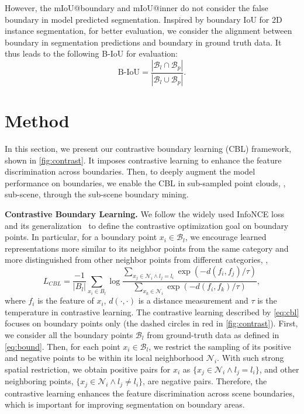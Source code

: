 \documentclass[10pt,twocolumn,letterpaper]{article}
\newcommand{\tly}{}
\begin{document}
However, the mIoU@boundary and mIoU@inner do not consider the false boundary in model predicted segmentation. Inspired by boundary IoU\cite{bound_iou} for 2D instance segmentation, for better evaluation, we consider the alignment between boundary in segmentation predictions and boundary in ground truth data. It thus leads to the following B-IoU for evaluation:
\begin{equation}
    \text{B-IoU} = \frac{|\mathcal B_l \cap \mathcal B_p|}{|\mathcal B_l \cup \mathcal B_p|}.
\label{eq:bound_iou}
\end{equation}

\section{Method}
In this section, we present our contrastive boundary learning (CBL) framework{\tly, shown in \cref{fig:contrast}}.
It imposes contrastive learning to enhance the feature discrimination across boundaries. Then, to deeply augment the model performance on boundaries, we enable the CBL in sub-sampled point clouds, \ie, sub-scene, through the sub-scene boundary mining.


\noindent\textbf{Contrastive Boundary Learning.}
We follow the widely used InfoNCE loss\cite{infonce} and its generalization~\cite{nce, softnn} to define the contrastive optimization goal on boundary points.
In particular, for a boundary point $x_i\in \mathcal B_l$, we encourage learned representations more similar to its neighbor points from the same category and more distinguished from other neighbor points from different categories, \ie,
\newcommand{\A}{\mathcal A}
\newcommand{\f}{f}  \newcommand{\B}{\mathcal B}
\begin{equation}
    L_{CBL} = \frac {-1}{|B_l|} \sum_{x_i \in B_l} \log \frac
{ \displaystyle \sum_{ x_j\in \mathcal N_i \land l_j = l_i } \exp(-d(\f_i, \f_j) / \tau) }
{ \displaystyle \sum_{ x_k\in\mathcal N_i} \exp(-d(\f_i, \f_k) / \tau) },
\label{eq:cbl}
\end{equation}
where ${\f_i}$ is the feature of $x_i$, $d(\cdot, \cdot)$ is a distance measurement and $\tau$ is the temperature in contrastive learning.
The contrastive learning described by \cref{eq:cbl} focuses on boundary points only {\tly(the dashed circles in red in \cref{fig:contrast})}. First, we consider all the boundary points $\mathcal B_l$ from ground-truth data as defined in \cref{eq:bound}.
Then, for each point $x_i\in \B_l$, we restrict the sampling of its positive and negative points to be within its local neighborhood $\mathcal N_i$. With such strong spatial restriction, we obtain positive pairs for $x_i$ as $\{x_j\in \mathcal N_i \land l_j=l_i\}$, and other neighboring points, \ie $\{x_j\in \mathcal N_i \land l_j\neq l_i\}$, are negative pairs.
Therefore, the contrastive learning enhances the feature discrimination across scene boundaries, which is important for improving segmentation on boundary areas.
\end{document}
